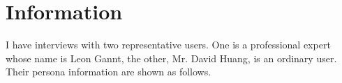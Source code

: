 \section{Information}
\vspace{4pt}
\noindent
I have interviews with two representative users. One is a professional expert whose name is Leon Gannt, the other, Mr. David Huang, is an ordinary user. Their persona information are shown as follows.


































